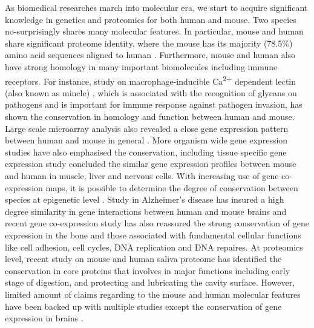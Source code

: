 As biomedical researches march into molecular era, we start to acquire significant knowledge in genetics and proteomics for both human and mouse. Two species no-surprisingly shares many molecular features. In particular, mouse and human share significant proteome identity, where the mouse has its majority (78.5\%) amino acid sequences aligned to human \cite{Lindblad_Toh_2001}. Furthermore, mouse and human also have strong homology in many important biomolecules including immune receptors. For instance, study on macrophage-inducible Ca\textsuperscript{2+} dependent lectin (also known as mincle) \cite{Rambaruth_2015}, which is associated with the recognition of glycans on pathogens \cite{Ishikawa_2009, 18490740, Yamasaki_2009} and is important for immune response against pathogen invasion,  has shown the conservation in homology and function between human and mouse. Large scale microarray analysis also revealed a close gene expression pattern between human and mouse in general \cite{Liao_2005}. More organism wide gene expression studies have also emphasised the conservation, including tissue specific gene expression study \cite{Zheng_Bradley_2010} concluded the similar gene expression profiles between mouse and human in muscle, liver and nervous cells. With increasing use of gene co-expression maps, it is possible to determine the degree of conservation between species at epigenetic level \cite{Stuart_2003,Oldham_2006}. Study in Alzheimer's disease \cite{Miller_2010} has insured a high degree similarity in gene interactions between human and mouse brains and recent gene co-expression study \cite{Monaco_2015} has also reassured the strong conservation of gene expression in the bone and those associated with fundamental cellular functions like cell adhesion, cell cycles, DNA replication and DNA repaires. \cite{Monaco_2015} At proteomics level, recent study on mouse and human saliva proteome \cite{Karn_2013} has identified the conservation in core proteins that involves in major functions including early stage of digestion, and protecting and lubricating the cavity surface. However, limited amount of claims regarding to the mouse and human molecular features have been backed up with multiple studies except the conservation of gene expression in brains \cite{Liao_2005, Voolstra_2006, Miller_2010, Chan_2009}. 
\\

